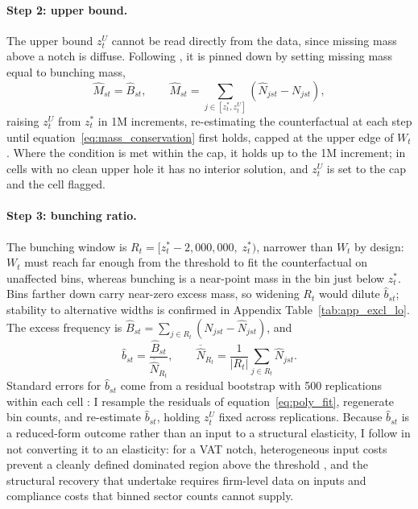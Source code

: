 \documentclass[12pt,oneside,a4paper]{report}
\begin{document}
\paragraph{Step 2: upper bound.}
The upper bound $z^U_t$ cannot be read directly from the data, since missing mass above a notch is diffuse. Following \textcite{kleven2013using}, it is pinned down by setting missing mass equal to bunching mass,
\begin{equation}
\hat{M}_{st} = \hat{B}_{st},
\qquad
\hat{M}_{st} = \sum_{j \in [z^*_t, z^U_t]}(\hat{N}_{jst} - N_{jst}),
\label{eq:mass_conservation}
\end{equation}
raising $z^U_t$ from $z^*_t$ in 1M increments, re-estimating the counterfactual at each step until equation~\eqref{eq:mass_conservation} first holds, capped at the upper edge of $W_t$. Where the condition is met within the cap, it holds up to the 1M increment; in cells with no clean upper hole it has no interior solution, and $z^U_t$ is set to the cap and the cell flagged.

\paragraph{Step 3: bunching ratio.}
The bunching window is $R_t = [z^*_t - 2{,}000{,}000,\; z^*_t)$, narrower than $W_t$ by design: $W_t$ must reach far enough from the threshold to fit the counterfactual on unaffected bins, whereas bunching is a near-point mass in the bin just below $z^*_t$. Bins farther down carry near-zero excess mass, so widening $R_t$ would dilute $\hat{b}_{st}$; stability to alternative widths is confirmed in Appendix Table~\ref{tab:app_excl_lo}. The excess frequency is $\hat{B}_{st} = \sum_{j \in R_t}(N_{jst} - \hat{N}_{jst})$, and
\begin{equation}
\hat{b}_{st} = \frac{\hat{B}_{st}}{\overline{\hat{N}}_{R_t}},
\qquad
\overline{\hat{N}}_{R_t} = \frac{1}{|R_t|}\sum_{j \in R_t}\hat{N}_{jst}.
\label{eq:b_hat_emp}
\end{equation}
Standard errors for $\hat{b}_{st}$ come from a residual bootstrap with 500 replications within each cell \parencite{chetty2011adjustment}: I resample the residuals of equation~\eqref{eq:poly_fit}, regenerate bin counts, and re-estimate $\hat{b}_{st}$, holding $z^U_t$ fixed across replications. Because $\hat{b}_{st}$ is a reduced-form outcome rather than an input to a structural elasticity, I follow \textcite{liu2021vat} in not converting it to an elasticity: for a VAT notch, heterogeneous input costs prevent a cleanly defined dominated region above the threshold \parencite{harju2019compliance}, and the structural recovery that \textcite{harju2019compliance} undertake requires firm-level data on inputs and compliance costs that binned sector counts cannot supply.
\end{document}
